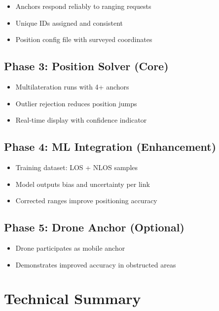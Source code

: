 \documentclass[11pt,a4paper]{article}
\begin{document}
\begin{itemize}
    \item[$\square$] Anchors respond reliably to ranging requests
    \item[$\square$] Unique IDs assigned and consistent
    \item[$\square$] Position config file with surveyed coordinates
\end{itemize}

\subsection{Phase 3: Position Solver (Core)}

\begin{itemize}
    \item[$\square$] Multilateration runs with 4+ anchors
    \item[$\square$] Outlier rejection reduces position jumps
    \item[$\square$] Real-time display with confidence indicator
\end{itemize}

\subsection{Phase 4: ML Integration (Enhancement)}

\begin{itemize}
    \item[$\square$] Training dataset: LOS + NLOS samples
    \item[$\square$] Model outputs bias and uncertainty per link
    \item[$\square$] Corrected ranges improve positioning accuracy
\end{itemize}

\subsection{Phase 5: Drone Anchor (Optional)}

\begin{itemize}
    \item[$\square$] Drone participates as mobile anchor
    \item[$\square$] Demonstrates improved accuracy in obstructed areas
\end{itemize}

\section{Technical Summary}
\end{document}
